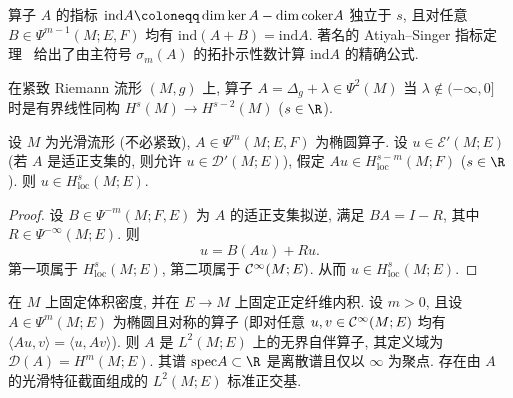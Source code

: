 \begin{remark}[Fredholm 指标]\label{rem:5.68}
算子 $A$ 的指标 $\mathrm{ind} A \defeq \dim\ker A - \dim\mathrm{coker} A$ 独立于 $s$, 且对任意 $B \in \Psi^{m-1}(M; E, F)$ 均有 $\mathrm{ind}(A + B) = \mathrm{ind} A$. 著名的 Atiyah--Singer 指标定理~\cite{AS63} 给出了由主符号 $\sigma_m(A)$ 的拓扑示性数计算 $\mathrm{ind} A$ 的精确公式.
\end{remark}

\begin{example}\label{eg:5.69}
在紧致 Riemann 流形 $(M, g)$ 上, 算子 $A = \Delta_g + \lambda \in \Psi^2(M)$ 当 $\lambda \notin (-\infty, 0]$ 时是有界线性同构 $H^s(M) \to H^{s-2}(M)$ ($s \in \R$).
\end{example}

\begin{theorem}[椭圆正则性]\label{thm:5.70}
设 $M$ 为光滑流形 (不必紧致), $A \in \Psi^m(M; E, F)$ 为椭圆算子. 设 $u \in \mathcal{E}'(M; E)$ (若 $A$ 是适正支集的, 则允许 $u \in \mathcal{D}'(M; E)$), 假定 $A u \in H_{\mathrm{loc}}^{s-m}(M; F)$ ($s \in \R$). 则 $u \in H_{\mathrm{loc}}^s(M; E)$.
\end{theorem}

\begin{proof}
设 $B \in \Psi^{-m}(M; F, E)$ 为 $A$ 的适正支集拟逆, 满足 $B A = I - R$, 其中 $R \in \Psi^{-\infty}(M; E)$. 则
\begin{equation}\label{eq:5.158}
    u = B(A u) + R u.
\end{equation}
第一项属于 $H_{\mathrm{loc}}^s(M; E)$, 第二项属于 $\mathcal{C}^\infty(M; E)$. 从而 $u \in H_{\mathrm{loc}}^s(M; E)$.
\end{proof}

\begin{theorem}[椭圆对称伪微分算子的自伴性]\label{thm:5.71}
在 $M$ 上固定体积密度, 并在 $E \to M$ 上固定正定纤维内积. 设 $m > 0$, 且设 $A \in \Psi^m(M; E)$ 为椭圆且对称的算子 (即对任意 $u, v \in \mathcal{C}^\infty(M; E)$ 均有 $\langle A u, v \rangle = \langle u, A v \rangle$). 则 $A$ 是 $L^2(M; E)$ 上的无界自伴算子, 其定义域为 $\mathcal{D}(A) = H^m(M; E)$. 其谱 $\mathrm{spec} A \subset \R$ 是离散谱且仅以 $\infty$ 为聚点. 存在由 $A$ 的光滑特征截面组成的 $L^2(M; E)$ 标准正交基.
\end{theorem}

